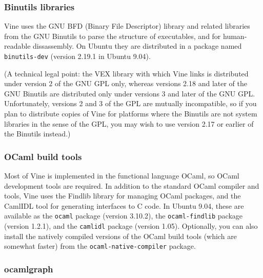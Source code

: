 \documentclass[11pt,onecolumn]{article}
\begin{document}
\subsubsection{Binutils libraries}

Vine uses the GNU BFD (Binary File Descriptor) library and related
libraries from the GNU Binutils to parse the structure of executables,
and for human-readable dissassembly. On Ubuntu they are distributed in
a package named {\tt binutils-dev} (version 2.19.1 in Ubuntu 9.04).

(A technical legal point: the VEX library with which Vine links is
distributed under version 2 of the GNU GPL only, whereas versions 2.18
and later of the GNU Binutils are distributed only under versions 3
and later of the GNU GPL.
%
Unfortunately, versions 2 and 3 of the GPL are mutually incompatible,
so if you plan to distribute copies of Vine for platforms where the
Binutils are not system libraries in the sense of the GPL, you may
wish to use version 2.17 or earlier of the Binutils instead.)

\subsubsection{OCaml build tools}

Most of Vine is implemented in the functional language OCaml, so OCaml
development tools are required.
%
In addition to the standard OCaml compiler and tools, Vine uses the
Findlib library for managing OCaml packages, and the CamlIDL tool for
generating interfaces to C code.
%
In Ubuntu 9.04, these are available as the {\tt ocaml} package
(version 3.10.2), the {\tt ocaml-findlib} package (version 1.2.1), and
the {\tt camlidl} package (version 1.05).
%
Optionally, you can also install the natively compiled versions of the
OCaml build tools (which are somewhat faster) from the
{\tt ocaml-native-compiler} package.

\subsubsection{\label{sec:ocamlgraph}ocamlgraph}
\end{document}
